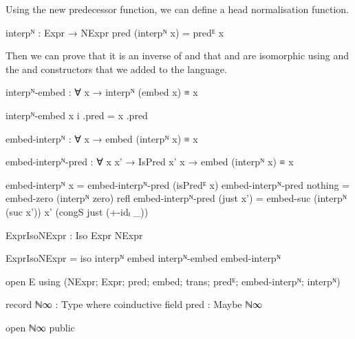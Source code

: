 Using the new predecessor function, we can define a head normalisation function.
\begin{code}
  interpᴺ : Expr → NExpr
  pred (interpᴺ x) = predᴱ x
\end{code}
Then we can prove that it is an inverse of  and
that  and  are isomorphic using
 and the  and
 constructors that we added to the language.
\begin{AgdaSuppressSpace}
\begin{code}
  interpᴺ-embed : ∀ x → interpᴺ (embed x) ≡ x
\end{code}
\begin{code}[hide]
  interpᴺ-embed x i .pred = x .pred
\end{code}
\begin{code}
  embed-interpᴺ : ∀ x → embed (interpᴺ x) ≡ x
\end{code}
\begin{code}[hide]
  embed-interpᴺ-pred : ∀ {x x'} → IsPred x' x → embed (interpᴺ x) ≡ x

  embed-interpᴺ x = embed-interpᴺ-pred (isPredᴱ x)
  embed-interpᴺ-pred nothing = embed-zero (interpᴺ zero) refl
  embed-interpᴺ-pred (just x') =
    embed-suc (interpᴺ (suc x')) x' (congS just (+-idₗ _))
\end{code}
\begin{code}
  ExprIsoNExpr : Iso Expr NExpr
\end{code}
\begin{code}[hide]
  ExprIsoNExpr = iso interpᴺ embed interpᴺ-embed embed-interpᴺ
\end{code}
\end{AgdaSuppressSpace}
\begin{code}[hide]
open E using (NExpr; Expr; pred; embed; trans; predᴱ; embed-interpᴺ; interpᴺ)

record ℕ∞ : Type where
  coinductive
  field pred : Maybe ℕ∞

open ℕ∞ public
\end{code}

